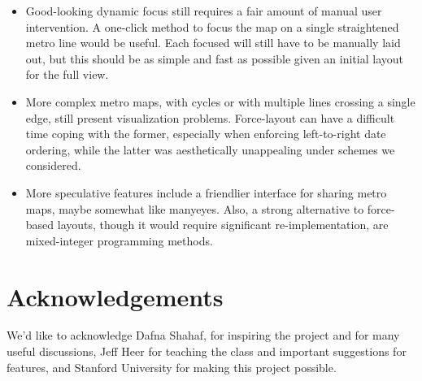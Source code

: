 \documentclass{chi2009}
\begin{document}
\begin{itemize}
    \item       Good-looking dynamic focus still requires a fair amount of manual user intervention. A one-click method to focus the map on a single straightened metro line would be useful. Each focused will still have to be manually laid out, but this should be as simple and fast as possible given an initial layout for the full view.
    \item       More complex metro maps, with cycles or with multiple lines crossing a single edge, still present visualization problems. Force-layout can have a difficult time coping with the former, especially when enforcing left-to-right date ordering, while the latter was aesthetically unappealing under schemes we considered.
    \item       More speculative features include a friendlier interface for sharing metro maps, maybe somewhat like manyeyes. Also, a strong alternative to force-based layouts, though it would require significant re-implementation, are mixed-integer programming methods.  
\end{itemize}

\section{Acknowledgements}

We'd like to acknowledge Dafna Shahaf, for inspiring the project and for many useful discussions, Jeff Heer for teaching the class and important suggestions for features, and Stanford University for making this project possible.



\end{document}
